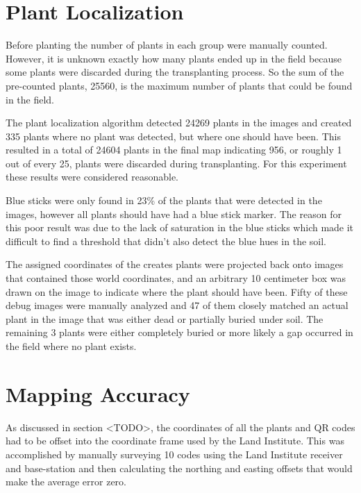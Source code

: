 
\section{Plant Localization}

Before planting the number of plants in each group were manually counted. However, it is unknown exactly how many plants ended up in the field because some plants were discarded during the transplanting process.  So the sum of the pre-counted plants, 25560, is the maximum number of plants that could be found in the field.  

The plant localization algorithm detected 24269 plants in the images and created 335 plants where no plant was detected, but where one should have been.  This resulted in a total of 24604 plants in the final map indicating 956, or roughly 1 out of every 25, plants were discarded during transplanting.  For this experiment these results were considered reasonable. 

Blue sticks were only found in 23\% of the plants that were detected in the images, however all plants should have had a blue stick marker.  The reason for this poor result was due to the lack of saturation in the blue sticks which made it difficult to find a threshold that didn't also detect the blue hues in the soil.  


The assigned coordinates of the creates plants were projected back onto images that contained those world coordinates, and an arbitrary 10 centimeter box was drawn on the image to indicate where the plant should have been.  Fifty of these debug images were manually analyzed and 47 of them closely matched an actual plant in the image that was either dead or partially buried under soil.  The remaining 3 plants were either completely buried or more likely a gap occurred in the field where no plant exists.  

\section{Mapping Accuracy}

As discussed in section <TODO>, the coordinates of all the plants and QR codes had to be offset into the coordinate frame used by the Land Institute.  This was accomplished by manually surveying 10 codes using the Land Institute receiver and base-station and then calculating the northing and easting offsets that would make the average error zero.  


